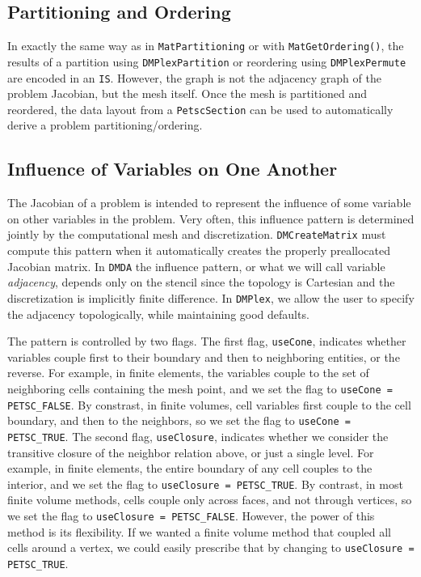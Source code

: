 \subsection{Partitioning and Ordering}

In exactly the same way as in \lstinline{MatPartitioning} or with \lstinline{MatGetOrdering()}, the results of a
partition using \lstinline{DMPlexPartition} or reordering using \lstinline{DMPlexPermute} are encoded in an
\lstinline{IS}. However, the graph is not the adjacency graph of the problem Jacobian, but the mesh
itself. Once the mesh is partitioned and reordered, the data layout from a \lstinline{PetscSection} can be used to automatically derive
a problem partitioning/ordering.

\subsection{Influence of Variables on One Another}

The Jacobian of a problem is intended to represent the influence of some variable on other variables in the
problem. Very often, this influence pattern is determined jointly by the computational mesh and
discretization. \lstinline{DMCreateMatrix} must compute this pattern when it automatically creates the properly
preallocated Jacobian matrix. In \lstinline{DMDA} the influence pattern, or what we will call
variable \textit{adjacency}, depends only on the stencil since the topology is Cartesian and the
discretization is implicitly finite difference. In \lstinline{DMPlex}, we allow the user to specify the adjacency
topologically, while maintaining good defaults.

The pattern is controlled by two flags. The first flag, \lstinline{useCone}, indicates whether variables couple first to
their boundary and then to neighboring entities, or the reverse. For example, in finite elements, the variables couple
to the set of neighboring cells containing the mesh point, and we set the flag to \lstinline{useCone = PETSC_FALSE}. By
constrast, in finite volumes, cell variables first couple to the cell boundary, and then to the neighbors, so we set the
flag to \lstinline{useCone = PETSC_TRUE}. The second flag, \lstinline{useClosure}, indicates whether we consider the
transitive closure of the neighbor relation above, or just a single level. For example, in finite elements, the entire
boundary of any cell couples to the interior, and we set the flag to \lstinline{useClosure = PETSC_TRUE}. By contrast,
in most finite volume methods, cells couple only across faces, and not through vertices, so we set the flag
to \lstinline{useClosure = PETSC_FALSE}. However, the power of this method is its flexibility. If we wanted a finite
volume method that coupled all cells around a vertex, we could easily prescribe that by changing
to \lstinline{useClosure = PETSC_TRUE}.

